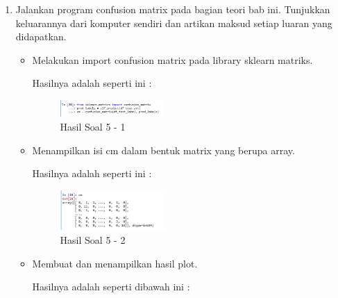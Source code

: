 \begin{enumerate}

\item Jalankan program confusion matrix pada bagian teori bab ini. Tunjukkan keluarannya dari komputer sendiri dan artikan maksud setiap luaran yang didapatkan.
\hfill\break

\begin{itemize}
	\item Melakukan import confusion matrix pada library sklearn matriks.
	
	Hasilnya adalah seperti ini :

	\begin{figure}[H]
	\centering
		\includegraphics[width=4cm]{figures/1174017/3/praktek/soal51.PNG}
		\caption{Hasil Soal 5 - 1}
	\end{figure}

	\item Menampilkan isi cm dalam bentuk matrix yang berupa array.
	
	Hasilnya adalah seperti ini :

	\begin{figure}[H]
	\centering
		\includegraphics[width=4cm]{figures/1174017/3/praktek/soal52.PNG}
		\caption{Hasil Soal 5 - 2}
	\end{figure}

	\item Membuat dan menampilkan hasil plot.
	
	Hasilnya adalah seperti dibawah ini :


\end{itemize}
\end{enumerate}
